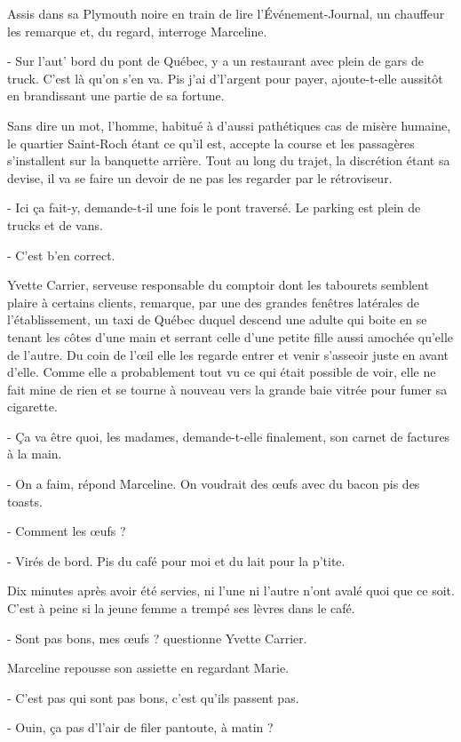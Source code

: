 Assis dans sa Plymouth noire en train de lire l’Événement-Journal, un chauffeur les remarque et, du regard, interroge Marceline.

- Sur l’aut’ bord du pont de Québec, y a un restaurant avec plein de gars de truck. C’est là qu’on s’en va. Pis j’ai d’l’argent pour payer, ajoute-t-elle aussitôt en brandissant une partie de sa fortune.

Sans dire un mot, l’homme, habitué à d’aussi pathétiques cas de misère humaine, le quartier Saint-Roch étant ce qu’il est, accepte la course et les passagères s’installent sur la banquette arrière. Tout au long du trajet, la discrétion étant sa devise, il va se faire un devoir de ne pas les regarder par le rétroviseur.

- Ici ça fait-y, demande-t-il une fois le pont traversé. Le parking est plein de trucks et de vans.

- C’est b’en correct.

Yvette Carrier, serveuse responsable du comptoir dont les tabourets semblent plaire à certains clients, remarque, par une des grandes fenêtres latérales de l’établissement, un taxi de Québec duquel descend une adulte qui boite en se tenant les côtes d’une main et serrant celle d’une petite fille aussi amochée qu’elle de l’autre. Du coin de l’œil elle les regarde entrer et venir s’asseoir juste en avant d’elle. Comme elle a probablement tout vu ce qui était possible de voir, elle ne fait mine de rien et se tourne à nouveau vers la grande baie vitrée pour fumer sa cigarette.

- Ça va être quoi, les madames, demande-t-elle finalement, son carnet de factures à la main.

- On a faim, répond Marceline. On voudrait des œufs avec du bacon pis des toasts.

- Comment les œufs ?

- Virés de bord. Pis du café pour moi et du lait pour la p’tite.

Dix minutes après avoir été servies, ni l’une ni l’autre n’ont avalé quoi que ce soit. C’est à peine si la jeune femme a trempé ses lèvres dans le café.

- Sont pas bons, mes œufs ? questionne Yvette Carrier.

Marceline repousse son assiette en regardant Marie.

- C’est pas qui sont pas bons, c’est qu’ils passent pas.

- Ouin, ça pas d’l’air de filer pantoute, à matin ?


